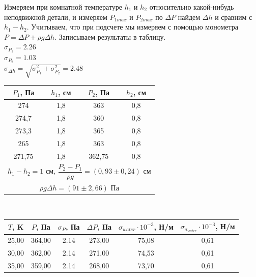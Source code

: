 \documentclass[a4paper, 12pt]{article}
\begin{document}
Измеряем при комнатной температуре $h_1$ и $h_2$ относительно какой-нибудь неподвижной детали, и измеряем $P_{1max}$ и $P_{2max}$ по $\Delta P$ найдем $\Delta h$ и сравним с $h_1 - h_2$. Учитываем, что при подсчете мы измеряем с помощью монометра $P = \Delta P + \rho g \Delta h$. Записываем результаты в таблицу. \\$\sigma_{P_1} = 2.26$ \\$\sigma_{P_2} = 1.03$ \\$\sigma_{\Delta h} = \sqrt{\sigma_{P_1}^2 + \sigma_{P_2}^2 } = 2.48$
\begin{center}
\begin{tabular}{|c|c|c|c|}
\hline
$P_1$, Па             & $h_1$, см            & $P_2$, Па            & $h_2$, см            \\ \hline
274                   & 1,8                  & 363                  & 0,8                  \\ \hline
274,7                 & 1,8                  & 360                  & 0,8                  \\ \hline
273,3                 & 1,8                  & 365                  & 0,8                  \\ \hline
265                   & 1,8                  & 363                  & 0,8                  \\ \hline \hline
271,75                & 1,8                  & 362,75               & 0,8                  \\ \hline
\multicolumn{4}{|c|}{$h_1 - h_2 = 1$ см, $\dfrac{P_2 - P_1}{\rho g} = (0,93 \pm 0,24)$ см} \\ \hline
\multicolumn{4}{|c|}{$\rho g \Delta h = (91 \pm 2,66)$ Па}                                  \\ \hline
\end{tabular} \\
\begin{tabular}{|c|c|c|c|c|c|}
\hline
$T$, K & $P$, Па & $\sigma_P$, Па & $\Delta P$, Па & $\sigma_{water} \cdot 10^{-3}$, Н/м & $\sigma_{\sigma_{water}} \cdot 10^{-3}$, Н/м \\ \hline
25,00  & 364,00  & 2.14           & 273,00    & 75,08                               & 0,61                                        \\ \hline
30,00  & 362,00  & 2.14           & 271,00    & 74,53                               & 0,61                                        \\ \hline
35,00  & 359,00  & 2.14           & 268,00    & 73,70                               & 0,61                                        \\ \hline

\end{tabular}
\end{center}
\end{document}
